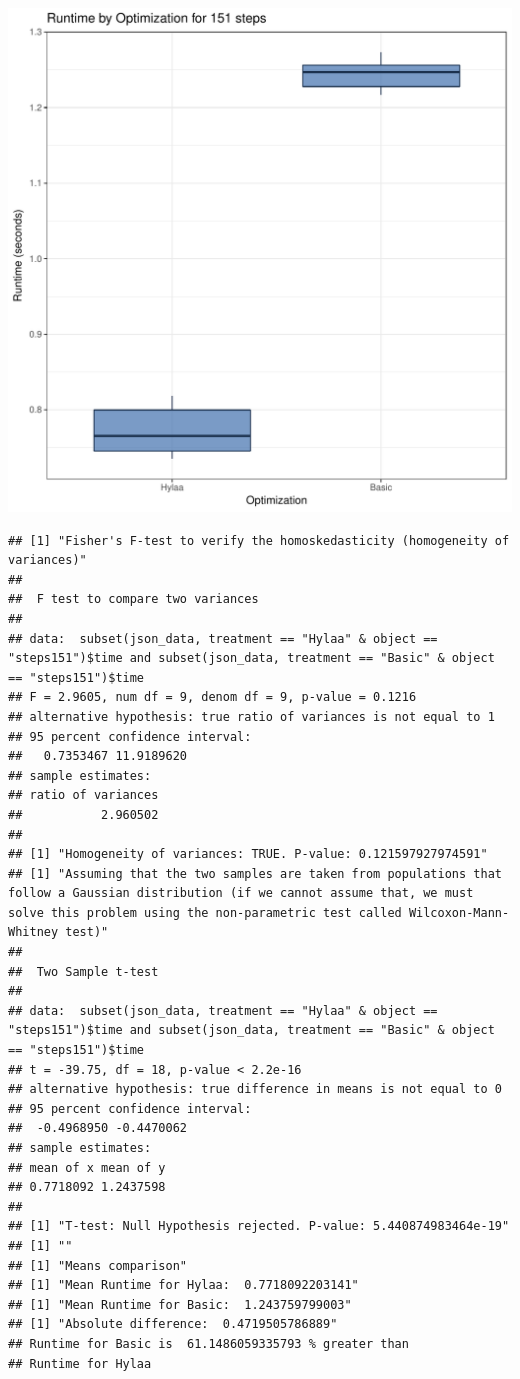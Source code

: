 \documentclass{article}\usepackage[]{graphicx}\usepackage[]{color}
\makeatletter
\def\maxwidth{ %
  \ifdim\Gin@nat@width>\linewidth
    \linewidth
  \else
    \Gin@nat@width
  \fi
}
\newenvironment{kframe}{%
 \def\at@end@of@kframe{}%
 \ifinner\ifhmode%
  \def\at@end@of@kframe{\end{minipage}}%
  \begin{minipage}{\columnwidth}%
 \fi\fi%
 \def\FrameCommand##1{\hskip\@totalleftmargin \hskip-\fboxsep
 \colorbox{shadecolor}{##1}\hskip-\fboxsep
     \hskip-\linewidth \hskip-\@totalleftmargin \hskip\columnwidth}%
 \MakeFramed {\advance\hsize-\width
   \@totalleftmargin\z@ \linewidth\hsize
   \@setminipage}}%
 {\par\unskip\endMakeFramed%
 \at@end@of@kframe}
\newenvironment{knitrout}{}{} %
\makeatother
\begin{document}
\begin{knitrout}
\color{fgcolor}
\includegraphics[width=\maxwidth]{figure/RH3_steps151-1} 
\begin{kframe}\begin{verbatim}
## [1] "Fisher's F-test to verify the homoskedasticity (homogeneity of variances)"
## 
## 	F test to compare two variances
## 
## data:  subset(json_data, treatment == "Hylaa" & object == "steps151")$time and subset(json_data, treatment == "Basic" & object == "steps151")$time
## F = 2.9605, num df = 9, denom df = 9, p-value = 0.1216
## alternative hypothesis: true ratio of variances is not equal to 1
## 95 percent confidence interval:
##   0.7353467 11.9189620
## sample estimates:
## ratio of variances 
##           2.960502 
## 
## [1] "Homogeneity of variances: TRUE. P-value: 0.121597927974591"
## [1] "Assuming that the two samples are taken from populations that follow a Gaussian distribution (if we cannot assume that, we must solve this problem using the non-parametric test called Wilcoxon-Mann-Whitney test)"
## 
## 	Two Sample t-test
## 
## data:  subset(json_data, treatment == "Hylaa" & object == "steps151")$time and subset(json_data, treatment == "Basic" & object == "steps151")$time
## t = -39.75, df = 18, p-value < 2.2e-16
## alternative hypothesis: true difference in means is not equal to 0
## 95 percent confidence interval:
##  -0.4968950 -0.4470062
## sample estimates:
## mean of x mean of y 
## 0.7718092 1.2437598 
## 
## [1] "T-test: Null Hypothesis rejected. P-value: 5.440874983464e-19"
## [1] ""
## [1] "Means comparison"
## [1] "Mean Runtime for Hylaa:  0.7718092203141"
## [1] "Mean Runtime for Basic:  1.243759799003"
## [1] "Absolute difference:  0.4719505786889"
## Runtime for Basic is  61.1486059335793 % greater than 
## Runtime for Hylaa
\end{verbatim}
\end{kframe}
\end{knitrout}
\end{document}
